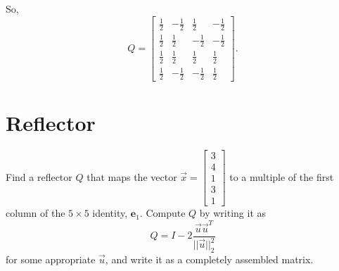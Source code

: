 \documentclass[letterpaper]{article}
\newcommand{\0}{\mathbf{0}}
\newcommand{\e}{\mathbf{e}}
\begin{document}
So, \[Q = \begin{bmatrix}
    \frac{1}{2}&-\frac{1}{2}&\frac{1}{2}&-\frac{1}{2} \\ 
    \frac{1}{2}&\frac{1}{2}&-\frac{1}{2}&-\frac{1}{2} \\ 
    \frac{1}{2}&\frac{1}{2}&\frac{1}{2}&\frac{1}{2} \\ 
    \frac{1}{2}&-\frac{1}{2}&-\frac{1}{2}&\frac{1}{2}
\end{bmatrix}.\]










\newpage 
\section{Reflector}
\begin{mdframed}
    Find a reflector $Q$ that maps the vector $\vec{x} = \begin{bmatrix}
        3 \\ 4 \\ 1 \\ 3 \\ 1
    \end{bmatrix}$ to a multiple of the first column of the $5 \times 5$ identity, $\e_1$. Compute $Q$ by writing it as \[Q = I - 2\frac{\vec{u}\vec{u}^T}{||\vec{u}||_2^2}\] for some appropriate $\vec{u}$, and write it as a completely assembled matrix.
\end{mdframed}
\end{document}
